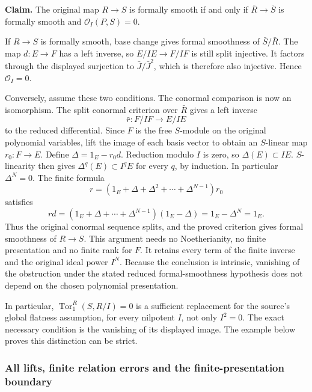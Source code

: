 \textbf{Claim.} The original map \(R\to S\) is formally smooth if and only if \(\bar R\to\bar S\) is formally smooth and \(\mathcal O_I(P,S)=0\).

If \(R\to S\) is formally smooth, base change gives formal smoothness of \(\bar S/\bar R\). The map \(d:E\to F\) has a left inverse, so \(E/IE\to F/IF\) is still split injective. It factors through the displayed surjection to \(\bar J/\bar J^2\), which is therefore also injective. Hence \(\mathcal O_I=0\).

Conversely, assume these two conditions. The conormal comparison is now an isomorphism. The split conormal criterion over \(\bar R\) gives a left inverse \[
\bar r:F/IF\longrightarrow E/IE
\] to the reduced differential. Since \(F\) is the free \(S\)-module on the original polynomial variables, lift the image of each basis vector to obtain an \(S\)-linear map \(r_0:F\to E\). Define \(\Delta=1_E-r_0d\). Reduction modulo \(I\) is zero, so \(\Delta(E)\subset IE\). \(S\)-linearity then gives \(\Delta^q(E)\subset I^qE\) for every \(q\), by induction. In particular \(\Delta^N=0\). The finite formula \[
r=(1_E+\Delta+\Delta^2+\cdots+\Delta^{N-1})r_0
\] satisfies \[
rd=(1_E+\Delta+\cdots+\Delta^{N-1})(1_E-\Delta)=1_E-\Delta^N=1_E.
\] Thus the original conormal sequence splits, and the proved criterion gives formal smoothness of \(R\to S\). This argument needs no Noetherianity, no finite presentation and no finite rank for \(F\). It retains every term of the finite inverse and the original ideal power \(I^N\). Because the conclusion is intrinsic, vanishing of the obstruction under the stated reduced formal-smoothness hypothesis does not depend on the chosen polynomial presentation.

In particular, \(\operatorname{Tor}_1^R(S,R/I)=0\) is a sufficient replacement for the source's global flatness assumption, for every nilpotent \(I\), not only \(I^2=0\). The exact necessary condition is the vanishing of its displayed image. The example below proves this distinction can be strict.

\subsubsection{All lifts, finite relation errors and the finite-presentation boundary}\label{algebra-proof-048-all-lifts-finite-relation-errors-and-the-finite-presentation-boundary}

